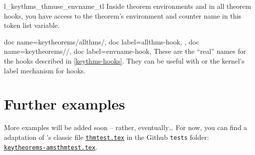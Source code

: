 \documentclass{ltxdoc}
\begin{document}
\begin{docCommand}{l_keythms_thmuse_envname_tl}{}
Inside theorem environments and in all theorem hooks, you have access to the theorem's environment and counter name in this token list variable.
\end{docCommand}

\begin{docKeys}[doc no index,color key=black]
  {
    {
      doc name=keytheorems/allthms/\textmd{},
      doc label=allthms-hook,
    },
    {
      doc name=keytheorems/\textmd{}/\textmd{},
      doc label=envname-hook,
    }
  }
These are the ``real'' names for the hooks described in \autoref{keythms-hooks}.
They can be useful with  or the kernel's label mechanism for hooks.
\end{docKeys}

\section{Further examples}

More examples will be added soon -- rather, eventually\dots{}
For now, you can find a  adaptation of 's classic file \href{https://mirrors.ctan.org/macros/latex/required/amscls/doc/thmtest.tex}{\texttt{thmtest.tex}} in the Github \texttt{tests} folder: \href{https://github.com/mbertucci47/keytheorems/blob/main/tests/keytheorems-amsthmtest.tex}{\texttt{keytheorems-amsthmtest.tex}}.


\printindex
\end{document}
